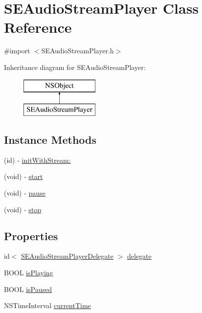 \hypertarget{interface_s_e_audio_stream_player}{\section{S\-E\-Audio\-Stream\-Player Class Reference}
\label{interface_s_e_audio_stream_player}
}


{\ttfamily \#import $<$S\-E\-Audio\-Stream\-Player.\-h$>$}

Inheritance diagram for S\-E\-Audio\-Stream\-Player\-:\begin{figure}[H]
\begin{center}
\leavevmode
\includegraphics[height=2.000000cm]{interface_s_e_audio_stream_player}
\end{center}
\end{figure}
\subsection*{Instance Methods}
\begin{DoxyCompactItemize}
\item 
(id) -\/ \hyperlink{interface_s_e_audio_stream_player_af81895d0a82b3255e9b9840def52599b}{init\-With\-Stream\-:}
\item 
(void) -\/ \hyperlink{interface_s_e_audio_stream_player_a16c600129d3045dc7f7213165df3ca66}{start}
\item 
(void) -\/ \hyperlink{interface_s_e_audio_stream_player_ab9e4c08bf6710368576d15ea05ecfe32}{pause}
\item 
(void) -\/ \hyperlink{interface_s_e_audio_stream_player_a80491754758a4dab432e18fcafb0721d}{stop}
\end{DoxyCompactItemize}
\subsection*{Properties}
\begin{DoxyCompactItemize}
\item 
id$<$ \hyperlink{protocol_s_e_audio_stream_player_delegate-p}{S\-E\-Audio\-Stream\-Player\-Delegate} $>$ \hyperlink{interface_s_e_audio_stream_player_a423b5909f11bd592bbef74ac92b18a30}{delegate}
\item 
B\-O\-O\-L \hyperlink{interface_s_e_audio_stream_player_ae9c780174af7f5d4bbd970049f7d1bb5}{is\-Playing}
\item 
B\-O\-O\-L \hyperlink{interface_s_e_audio_stream_player_ad6bec3654ff73d3fd4d11111a1f69442}{is\-Paused}
\item 
N\-S\-Time\-Interval \hyperlink{interface_s_e_audio_stream_player_a079874e98c33b3fc543f9ca6ea2a59e7}{current\-Time}
\end{DoxyCompactItemize}


